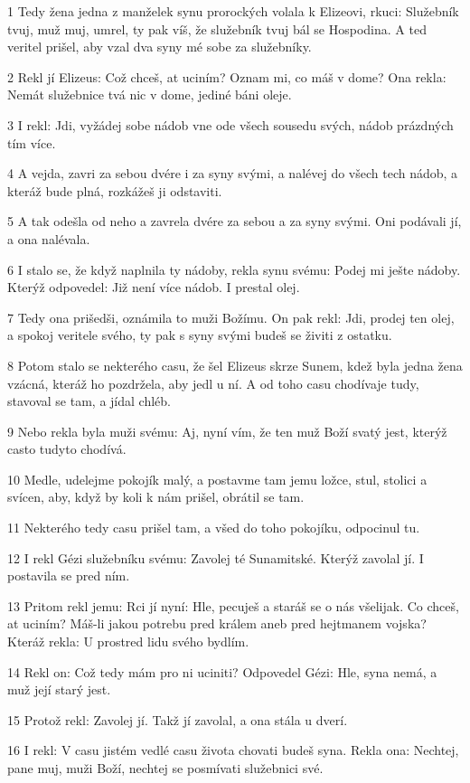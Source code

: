 \par 1 Tedy žena jedna z manželek synu prorockých volala k Elizeovi, rkuci: Služebník tvuj, muž muj, umrel, ty pak víš, že služebník tvuj bál se Hospodina. A ted veritel prišel, aby vzal dva syny mé sobe za služebníky.
\par 2 Rekl jí Elizeus: Což chceš, at uciním? Oznam mi, co máš v dome? Ona rekla: Nemát služebnice tvá nic v dome, jediné báni oleje.
\par 3 I rekl: Jdi, vyžádej sobe nádob vne ode všech sousedu svých, nádob prázdných tím více.
\par 4 A vejda, zavri za sebou dvére i za syny svými, a nalévej do všech tech nádob, a kteráž bude plná, rozkážeš ji odstaviti.
\par 5 A tak odešla od neho a zavrela dvére za sebou a za syny svými. Oni podávali jí, a ona nalévala.
\par 6 I stalo se, že když naplnila ty nádoby, rekla synu svému: Podej mi ješte nádoby. Kterýž odpovedel: Již není více nádob. I prestal olej.
\par 7 Tedy ona prišedši, oznámila to muži Božímu. On pak rekl: Jdi, prodej ten olej, a spokoj veritele svého, ty pak s syny svými budeš se živiti z ostatku.
\par 8 Potom stalo se nekterého casu, že šel Elizeus skrze Sunem, kdež byla jedna žena vzácná, kteráž ho pozdržela, aby jedl u ní. A od toho casu chodívaje tudy, stavoval se tam, a jídal chléb.
\par 9 Nebo rekla byla muži svému: Aj, nyní vím, že ten muž Boží svatý jest, kterýž casto tudyto chodívá.
\par 10 Medle, udelejme pokojík malý, a postavme tam jemu ložce, stul, stolici a svícen, aby, když by koli k nám prišel, obrátil se tam.
\par 11 Nekterého tedy casu prišel tam, a všed do toho pokojíku, odpocinul tu.
\par 12 I rekl Gézi služebníku svému: Zavolej té Sunamitské. Kterýž zavolal jí. I postavila se pred ním.
\par 13 Pritom rekl jemu: Rci jí nyní: Hle, pecuješ a staráš se o nás všelijak. Co chceš, at uciním? Máš-li jakou potrebu pred králem aneb pred hejtmanem vojska? Kteráž rekla: U prostred lidu svého bydlím.
\par 14 Rekl on: Což tedy mám pro ni uciniti? Odpovedel Gézi: Hle, syna nemá, a muž její starý jest.
\par 15 Protož rekl: Zavolej jí. Takž jí zavolal, a ona stála u dverí.
\par 16 I rekl: V casu jistém vedlé casu života chovati budeš syna. Rekla ona: Nechtej, pane muj, muži Boží, nechtej se posmívati služebnici své.
